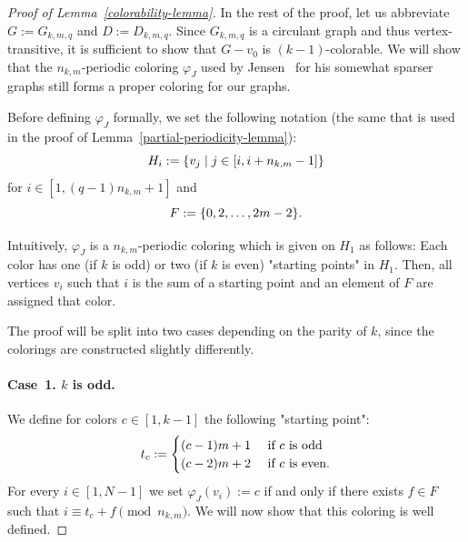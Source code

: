 \documentclass[a4paper,10pt,hidelinks]{amsart}
\renewcommand{\phi}{\ensuremath{\varphi}}
\theoremstyle{definition}
\begin{document}
\begin{proof}[Proof of Lemma~\ref{colorability-lemma}]
In the rest of the proof, let us abbreviate $G:=G_{k,m,q}$ and $D:=D_{k,m,q}$. Since $G_{k,m,q}$ is a circulant graph and thus vertex-transitive, it is sufficient to show that $G - v_0$ is $(k-1)$-colorable. We will show that the $n_{k,m}$-periodic coloring $\varphi_J$ used by Jensen~\cite{jensen} for his somewhat sparser graphs still forms a proper coloring for our graphs.

    Before defining $\phi_J$ formally, we set the following notation (the same that is used in the proof of Lemma~\ref{partial-periodicity-lemma}):
    \begin{equation}\notag
        H_i := \{v_j \mid j \in [i, i + n_{k,m} - 1]\}
    \end{equation} 
    for $i \in [1, (q-1)n_{k,m} + 1]$ and
    \begin{equation}\notag
        F := \{0, 2, \dots, 2m - 2\}. 
    \end{equation}

    Intuitively, $\varphi_J$ is a $n_{k,m}$-periodic coloring which is given on $H_1$ as follows: Each color has one (if $k$ is odd) or two (if $k$ is even) "starting points" in $H_1$. Then, all vertices $v_i$ such that $i$ is the sum of a starting point and an element of $F$ are assigned that color.

    The proof will be split into two cases depending on the parity of $k$, since the colorings are constructed slightly differently.

    \medskip
    
    \paragraph*{\textbf{Case~1.} $k$ is odd.}


    We define for colors $c \in [1, k - 1]$ the following "starting point":
    \begin{equation} \notag
        t_c := 
        \begin{cases}
        (c - 1)m + 1 & \text{ if } c \text{ is odd} \\
        (c - 2)m + 2 & \text{ if } c \text{ is even}.
        \end{cases}
    \end{equation} 
    For every $i \in [1, N-1]$ we set $\varphi_J(v_i) := c$ if and only if there exists $f \in F$ such that $i \equiv t_c + f \pmod{n_{k, m}}$. We will now show that this coloring is well defined. 


\end{proof}
\end{document}
